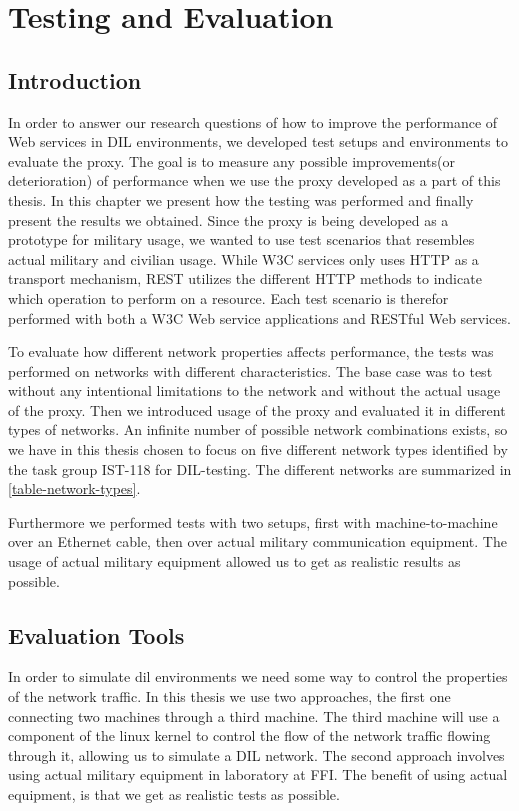 \chapter{Testing and Evaluation}



\section{Introduction}

In order to answer our research questions of how to improve the performance of
Web services in DIL environments, we developed test setups and environments to
evaluate the proxy. The goal is to measure any possible improvements(or
deterioration) of performance when we use the proxy developed as a part of this
thesis. In this chapter we present how the testing was performed and finally
present the results we obtained. Since the proxy is being developed as a
prototype for military usage, we wanted to use test scenarios that resembles
actual military and civilian usage.  While W3C services only uses HTTP as a
transport mechanism, REST utilizes the different HTTP methods to indicate which
operation to perform on a resource. Each test scenario is therefor performed
with both a W3C Web service applications and RESTful Web services.

To evaluate how different network properties affects performance, the tests
was performed on networks with different characteristics. The base case was to
test without any intentional limitations to the network and without the actual
usage of the proxy. Then we introduced usage of the proxy and evaluated it in
different types of networks. An infinite number of possible network
combinations exists, so we have in this thesis chosen to focus on five
different network types identified by the task group IST-118 for DIL-testing.
The different networks are summarized in \cref{table-network-types}.

Furthermore we performed tests with two setups, first with machine-to-machine
over an Ethernet cable, then over actual military communication equipment. The
usage of actual military equipment allowed us to get as realistic results as
possible.


\section{Evaluation Tools}

In order to simulate \gls{dil} environments we need some way to control the
properties of the network traffic. In this thesis we use two approaches, the
first one connecting two machines through a third machine. The third machine
will use a component of the linux kernel to control the flow of the network
traffic flowing through it, allowing us to simulate a DIL network. The second
approach involves using actual military equipment in laboratory at FFI. The
benefit of using actual equipment, is that we get as realistic tests as
possible.

